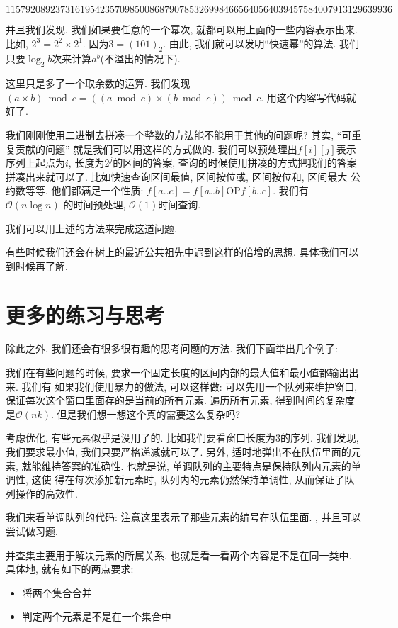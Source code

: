 $$
115792089237316195423570985008687907853269984665640564039457584007913129639936
$$

并且我们发现, 我们如果要任意的一个幂次, 就都可以用上面的一些内容表示出来. 比如, $2^3=2^2\times 2^1$.
因为$3=(101)_2$. 由此, 我们就可以发明``快速幂''的算法. 我们只要$\log_2 b$次来计算$a^b$(不溢出的情况下).

 这里只是多了一个取余数的运算. 我们发现
$(a\times b)\bmod c = ((a\bmod c)\times (b\bmod c))\bmod c$. 用这个内容写代码就好了. 


  我们刚刚使用二进制去拼凑一个整数的方法能不能用于其他的问题呢? 其实, ``可重复贡献的问题''
就是我们可以用这样的方式做的. 我们可以预处理出$f[i][j]$表示序列上起点为$i$, 长度为$2^j$的区间的答案, 
查询的时候使用拼凑的方式把我们的答案拼凑出来就可以了. 比如快速查询区间最值, 区间按位或, 区间按位和, 区间最大
公约数等等. 他们都满足一个性质: $f[a..c] = f[a..b] \text{OP} f[b..c]$. 我们有$\mathcal O(n\log n)$
的时间预处理, $\mathcal O(1)$时间查询. 

 我们可以用上述的方法来完成这道问题. 

有些时候我们还会在树上的最近公共祖先中遇到这样的倍增的思想. 具体我们可以到时候再了解. 

\section{更多的练习与思考}

除此之外, 我们还会有很多很有趣的思考问题的方法. 我们下面举出几个例子: 

 我们在有些问题的时候, 要求一个固定长度的区间内部的最大值和最小值都输出出来. 我们有
如果我们使用暴力的做法, 可以这样做: 可以先用一个队列来维护窗口, 保证每次这个窗口里面存的是当前的所有元素. 
遍历所有元素, 得到时间的复杂度是$\mathcal O(nk)$. 但是我们想一想这个真的需要这么复杂吗? 

考虑优化, 有些元素似乎是没用了的. 比如我们要看窗口长度为3的序列. 我们发现, 
我们要求最小值, 我们只要严格递减就可以了. 另外, 适时地弹出不在队伍里面的元素,
就能维持答案的准确性. 也就是说, 单调队列的主要特点是保持队列内元素的单调性, 这使
得在每次添加新元素时, 队列内的元素仍然保持单调性, 从而保证了队列操作的高效性.  


我们来看单调队列的代码: 注意这里表示了那些元素的编号在队伍里面. 
, 并且可以尝试做习题. 

 并查集主要用于解决元素的所属关系, 也就是看一看两个内容是不是在同一类中. 
具体地, 就有如下的两点要求: 
\begin{itemize}
    \item 将两个集合合并
    \item 判定两个元素是不是在一个集合中
\end{itemize}

